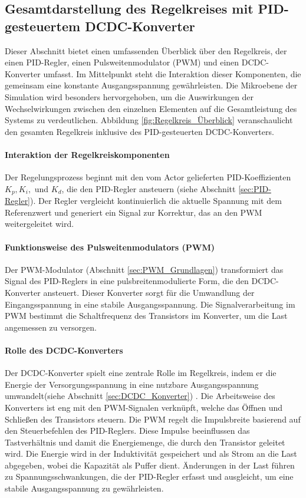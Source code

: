 \subsection{Gesamtdarstellung des Regelkreises mit PID-gesteuertem DCDC-Konverter}
\label{sec:Gesamtdarstellung_Regelkreis}

Dieser Abschnitt bietet einen umfassenden Überblick über den Regelkreis, der einen PID-Regler, einen Pulsweitenmodulator (PWM) und einen DCDC-Konverter umfasst. Im Mittelpunkt steht die Interaktion dieser Komponenten, die gemeinsam eine konstante Ausgangsspannung gewährleisten. Die Mikroebene der Simulation wird besonders hervorgehoben, um die Auswirkungen der Wechselwirkungen zwischen den einzelnen Elementen auf die Gesamtleistung des Systems zu verdeutlichen.
Abbildung \ref{fig:Regelkreis_Überblick} veranschaulicht den gesamten Regelkreis inklusive des PID-gesteuerten DCDC-Konverters.

\paragraph{Interaktion der Regelkreiskomponenten}
Der Regelungsprozess beginnt mit den vom Actor gelieferten PID-Koeffizienten \( K_p, K_i, \) und \( K_d \), die den PID-Regler ansteuern (siehe Abschnitt \ref{sec:PID-Regler}). Der Regler vergleicht kontinuierlich die aktuelle Spannung mit dem Referenzwert und generiert ein Signal zur Korrektur, das an den PWM weitergeleitet wird.

\paragraph{Funktionsweise des Pulsweitenmodulators (PWM)}
Der PWM-Modulator (Abschnitt \ref{sec:PWM_Grundlagen}) transformiert das Signal des PID-Reglers in eine pulsbreitenmodulierte Form, die den DCDC-Konverter ansteuert. Dieser Konverter sorgt für die Umwandlung der Eingangsspannung in eine stabile Ausgangsspannung. Die Signalverarbeitung im PWM bestimmt die Schaltfrequenz des Transistors im Konverter, um die Last angemessen zu versorgen.

\paragraph{Rolle des DCDC-Konverters}
Der DCDC-Konverter spielt eine zentrale Rolle im Regelkreis, indem er die Energie der Versorgungsspannung in eine nutzbare Ausgangsspannung umwandelt(siehe Abschnitt \ref{sec:DCDC_Konverter}) . Die Arbeitsweise des Konverters ist eng mit den PWM-Signalen verknüpft, welche das Öffnen und Schließen des Transistors steuern. Die PWM regelt die Impulsbreite basierend auf den Steuerbefehlen des PID-Reglers. Diese Impulse beeinflussen das Tastverhältnis und damit die Energiemenge, die durch den Transistor geleitet wird. Die Energie wird in der Induktivität gespeichert und als Strom an die Last abgegeben, wobei die Kapazität als Puffer dient. Änderungen in der Last führen zu Spannungsschwankungen, die der PID-Regler erfasst und ausgleicht, um eine stabile Ausgangsspannung zu gewährleisten.

